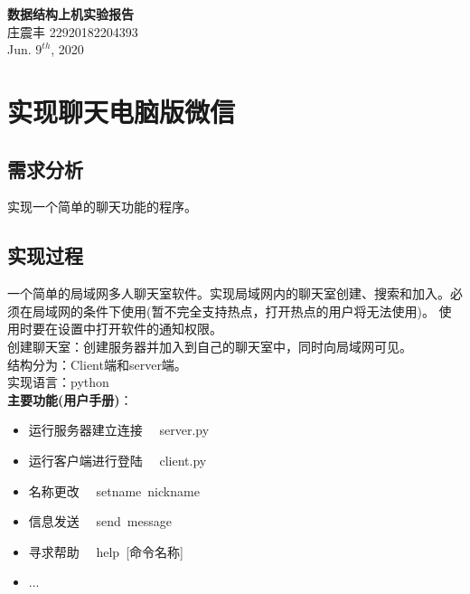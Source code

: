 \documentclass[UTF8,a4paper]{article}
\begin{document}
\begin{center}
    \textbf{\LARGE{数据结构上机实验报告}}\\[0.5cm]
    \normalsize{庄震丰 22920182204393}\\[0.3cm]
    \large{Jun. $9^{th}$, 2020}
\end{center}
\section{实现聊天电脑版微信}
\subsection{需求分析}
实现一个简单的聊天功能的程序。
\subsection{实现过程}
一个简单的局域网多人聊天室软件。实现局域网内的聊天室创建、搜索和加入。必须在局域网的条件下使用(暂不完全支持热点，打开热点的用户将无法使用)。
使用时要在设置中打开软件的通知权限。\\
创建聊天室：创建服务器并加入到自己的聊天室中，同时向局域网可见。\\
结构分为：Client端和server端。\\
实现语言：python\\[0.5cm]
\textbf{主要功能(用户手册)}：
\begin{itemize}
    \item 运行服务器建立连接~~ server.py
    \item 运行客户端进行登陆~~ client.py
    \item 名称更改 ~~setname~nickname
    \item 信息发送 ~~send~message
    \item 寻求帮助 ~~help~[命令名称]
    \item ...
\end{itemize}
\end{document}
